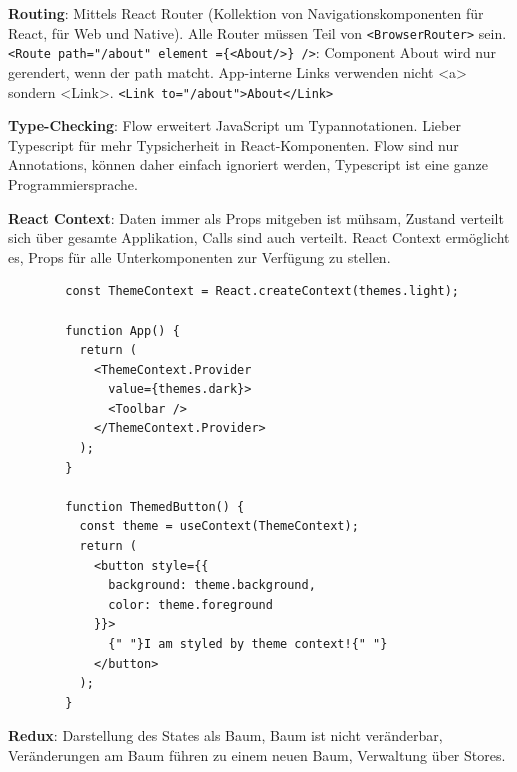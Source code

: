 \documentclass[10pt,landscape]{article}
\begin{document}
\begin{multicols}{3}
        \textbf{Routing}: Mittels React Router (Kollektion von Navigationskomponenten für React, für Web und Native).
        Alle Router müssen Teil von \lstinline{<BrowserRouter>} sein.
        \lstinline[mathescape]!<Route path="/about" element ={<About/>} />!: Component About wird nur gerendert, wenn der path matcht.
        App-interne Links verwenden nicht <a> sondern <Link>. \lstinline[mathescape]!<Link to="/about">About</Link>!

        \textbf{Type-Checking}: Flow erweitert JavaScript um Typannotationen.
        Lieber Typescript für mehr Typsicherheit in React-Komponenten.
        Flow sind nur Annotations, können daher einfach ignoriert werden, Typescript ist eine ganze Programmiersprache.

        \textbf{React Context}: Daten immer als Props mitgeben ist mühsam, Zustand verteilt sich über gesamte Applikation, Calls sind auch verteilt.
        React Context ermöglicht es, Props für alle Unterkomponenten zur Verfügung zu stellen.

        \begin{lstlisting}
        const ThemeContext = React.createContext(themes.light);

        function App() {
          return (
            <ThemeContext.Provider
              value={themes.dark}>
              <Toolbar />
            </ThemeContext.Provider>
          );
        }

        function ThemedButton() {
          const theme = useContext(ThemeContext);
          return (
            <button style={{
              background: theme.background,
              color: theme.foreground
            }}>
              {" "}I am styled by theme context!{" "}
            </button>
          );
        }
        \end{lstlisting}

        \textbf{Redux}: Darstellung des States als Baum, Baum ist nicht veränderbar, Veränderungen am Baum führen zu einem neuen Baum, Verwaltung über Stores.


\end{multicols}
\end{document}

